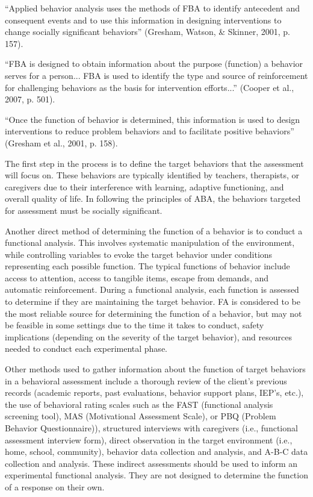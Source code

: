 ``Applied behavior analysis uses the methods of FBA to identify antecedent and consequent events and to use this information in designing interventions to change socially significant behaviors'' (Gresham, Watson, \& Skinner, 2001, p. 157).

``FBA is designed to obtain information about  the purpose (function) a behavior serves for a person... FBA is used to identify the type and source of reinforcement for challenging behaviors as the basis for intervention efforts...'' (Cooper et al., 2007, p. 501).

``Once the function of behavior is determined, this information is used to design interventions to reduce problem behaviors and to facilitate positive behaviors'' (Gresham et al., 2001, p. 158).

The first step in the process is to define the target behaviors that the assessment will focus on. These behaviors are typically identified by teachers, therapists, or caregivers due to their interference with learning, adaptive functioning, and overall quality of life. In following the principles of ABA, the behaviors targeted for assessment must be socially significant.

Another direct method of determining the function of a behavior is to conduct a functional analysis. This involves systematic manipulation of the environment, while controlling variables to evoke the target behavior under conditions representing each possible function. The typical functions of behavior include access to attention, access to tangible items, escape from demands, and automatic reinforcement. During a functional analysis, each function is assessed to determine if they are maintaining the target behavior. FA is considered to be the most reliable source for determining the function of a behavior, but may not be feasible in some settings due to the time it takes to conduct, safety implications (depending on the severity of the target behavior), and resources needed to conduct each experimental phase.

Other methods used to gather information about the function of target behaviors in a behavioral assessment include a thorough review of the client's previous records (academic reports, past evaluations, behavior support plans, IEP's, etc.), the use of behavioral rating scales such as the FAST (functional analysis screening tool), MAS (Motivational Assessment Scale), or PBQ (Problem Behavior Questionnaire)), structured interviews with caregivers (i.e., functional assessment interview form), direct observation in the target environment (i.e., home, school, community), behavior data collection and analysis, and A-B-C data collection and analysis. These indirect assessments should be used to inform an experimental functional analysis. They are not designed to determine the function of a response on their own.

